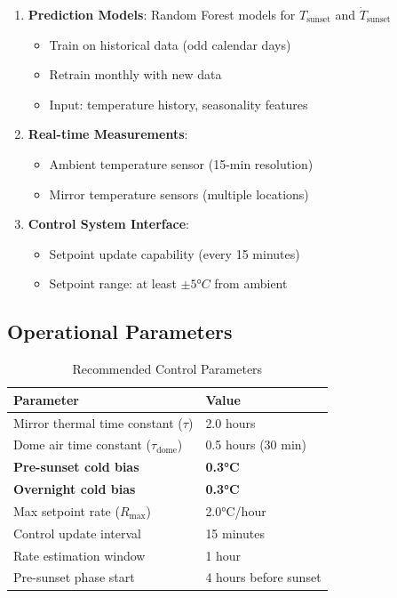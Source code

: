 \documentclass[11pt,letterpaper]{article}
\begin{document}
\begin{enumerate}
    \item \textbf{Prediction Models}: Random Forest models for $T_\text{sunset}$ and $\dot{T}_\text{sunset}$
    \begin{itemize}
        \item Train on historical data (odd calendar days)
        \item Retrain monthly with new data
        \item Input: temperature history, seasonality features
    \end{itemize}

    \item \textbf{Real-time Measurements}:
    \begin{itemize}
        \item Ambient temperature sensor (15-min resolution)
        \item Mirror temperature sensors (multiple locations)
    \end{itemize}

    \item \textbf{Control System Interface}:
    \begin{itemize}
        \item Setpoint update capability (every 15 minutes)
        \item Setpoint range: at least $\pm 5°C$ from ambient
    \end{itemize}
\end{enumerate}

\subsection{Operational Parameters}

\begin{table}[H]
\centering
\caption{Recommended Control Parameters}
\label{tab:params}
\begin{tabular}{ll}
\toprule
\textbf{Parameter} & \textbf{Value} \\
\midrule
Mirror thermal time constant ($\tau$) & 2.0 hours \\
Dome air time constant ($\tau_\text{dome}$) & 0.5 hours (30 min) \\
\textbf{Pre-sunset cold bias} & \textbf{0.3°C} \\
\textbf{Overnight cold bias} & \textbf{0.3°C} \\
Max setpoint rate ($R_\text{max}$) & 2.0°C/hour \\
Control update interval & 15 minutes \\
Rate estimation window & 1 hour \\
Pre-sunset phase start & 4 hours before sunset \\
\bottomrule
\end{tabular}
\end{table}
\end{document}
